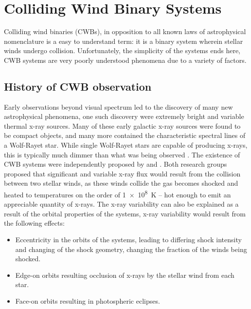 \section{Colliding Wind Binary Systems}
\label{sec:cwb}

Colliding wind binaries (CWBs), in opposition to all known laws of astrophysical nomenclature is a easy to understand term: it is a binary system wherein stellar winds undergo collision.
Unfortunately, the simplicity of the systems ends here, CWB systems are very poorly understood phenomena due to a variety of factors.

\subsection{History of CWB observation}


Early observations beyond visual spectrum led to the discovery of many new astrophysical phenomena, one such discovery were extremely bright and variable thermal x-ray sources.
Many of these early galactic x-ray sources were found to be compact objects, and many more contained the characteristic spectral lines of a Wolf-Rayet star.
While single Wolf-Rayet stars are capable of producing x-rays, this is typically much dimmer than what was being observed 
\parencite{sewardXraysEtaCarinae1979}.
The existence of CWB systems were independently proposed by \textcite{prilutskii_x_1976} and \textcite{cherepashchukDetectabilityWolfRayetBinaries1976}. 
Both research groups proposed that significant and variable x-ray flux would result from the collision between two stellar winds, as these winds collide the gas becomes shocked and heated to temperatures on the order of \SI{1e8}{\kelvin} -- hot enough to emit an appreciable quantity of x-rays.
The x-ray variability can also be explained as a result of the orbital properties of the systems, x-ray variability would result from the following effects:

\begin{itemize}
  \item Eccentricity in the orbits of the systems, leading to differing shock intensity and changing of the shock geometry, changing the fraction of the winds being shocked.
  \item Edge-on orbits resulting occlusion of x-rays by the stellar wind from each star. 
  \item Face-on orbits resulting in photospheric eclipses.
\end{itemize}


